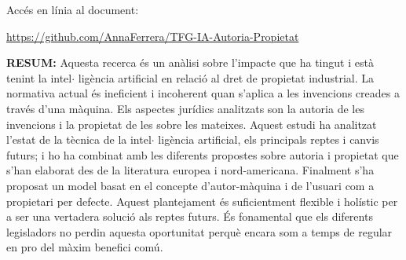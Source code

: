 \documentclass[12pt]{article}
\begin{document}
\par


\vspace{\baselineskip}

\vspace{\baselineskip}

\vspace{\baselineskip}

\vspace{\baselineskip}

\vspace{\baselineskip}

\vspace{\baselineskip}

\vspace{\baselineskip}

\vspace{\baselineskip}
\begin{Center}
{\fontsize{10pt}{12.0pt}\selectfont Accés en línia al document:\par}
\end{Center}\par

\begin{Center}
\href{https://github.com/AnnaFerrera/TFG-IA-Autoria-Propietat}{https://github.com/AnnaFerrera/TFG-IA-Autoria-Propietat}
\end{Center}\par


\vspace{\baselineskip}
\begin{justify}
\textbf{RESUM: }Aquesta recerca és un anàlisi sobre l’impacte que ha tingut i està tenint la intel$ \cdot $ ligència artificial en relació al dret de propietat industrial. La normativa actual és ineficient i incoherent quan s’aplica a les invencions creades a través d’una màquina. Els aspectes jurídics analitzats son la autoria de les invencions i la propietat de les sobre les mateixes. Aquest estudi ha analitzat l’estat de la tècnica de la intel$ \cdot $ ligència artificial, els principals reptes i canvis futurs; i ho ha combinat amb les diferents propostes sobre autoria i propietat que s’han elaborat des de la literatura europea i nord-americana. Finalment s’ha proposat un model basat en el concepte d’autor-màquina i de l’usuari com a propietari per defecte. Aquest plantejament és suficientment flexible i holístic per a ser una vertadera solució als reptes futurs. És fonamental que els diferents legisladors no perdin aquesta oportunitat perquè encara som a temps de regular en pro del màxim benefici comú. 
\end{justify}\par
\end{document}
